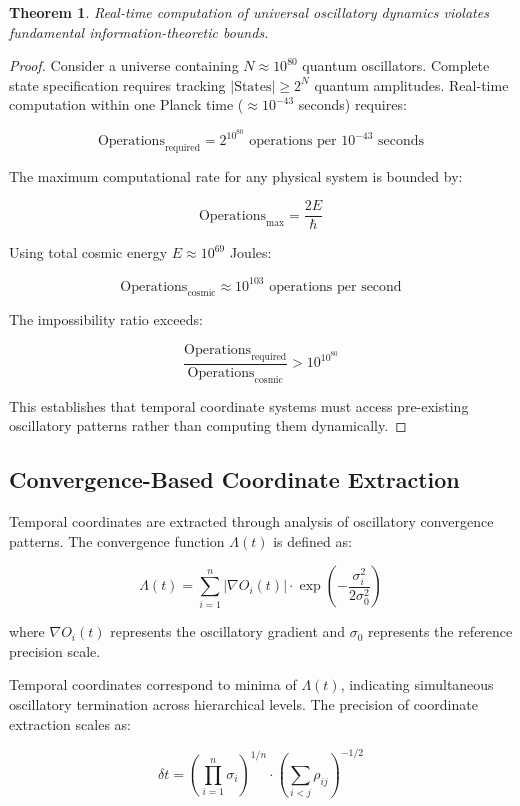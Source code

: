 \documentclass[11pt]{article}
\newtheorem{theorem}{Theorem}[section]
\theoremstyle{remark}
\begin{document}
\begin{theorem}
Real-time computation of universal oscillatory dynamics violates fundamental information-theoretic bounds.
\end{theorem}

\begin{proof}
Consider a universe containing $N \approx 10^{80}$ quantum oscillators. Complete state specification requires tracking $|\text{States}| \geq 2^N$ quantum amplitudes. Real-time computation within one Planck time ($\approx 10^{-43}$ seconds) requires:

$$\text{Operations}_{\text{required}} = 2^{10^{80}} \text{ operations per } 10^{-43} \text{ seconds}$$

The maximum computational rate for any physical system is bounded by:

$$\text{Operations}_{\text{max}} = \frac{2E}{\hbar}$$

Using total cosmic energy $E \approx 10^{69}$ Joules:

$$\text{Operations}_{\text{cosmic}} \approx 10^{103} \text{ operations per second}$$

The impossibility ratio exceeds:

$$\frac{\text{Operations}_{\text{required}}}{\text{Operations}_{\text{cosmic}}} > 10^{10^{80}}$$

This establishes that temporal coordinate systems must access pre-existing oscillatory patterns rather than computing them dynamically.
\end{proof}

\subsection{Convergence-Based Coordinate Extraction}

Temporal coordinates are extracted through analysis of oscillatory convergence patterns. The convergence function $\Lambda(t)$ is defined as:

$$\Lambda(t) = \sum_{i=1}^{n} |\nabla O_i(t)| \cdot \exp\left(-\frac{\sigma_i^2}{2\sigma_0^2}\right)$$

where $\nabla O_i(t)$ represents the oscillatory gradient and $\sigma_0$ represents the reference precision scale.

Temporal coordinates correspond to minima of $\Lambda(t)$, indicating simultaneous oscillatory termination across hierarchical levels. The precision of coordinate extraction scales as:

$$\delta t = \left(\prod_{i=1}^{n} \sigma_i\right)^{1/n} \cdot \left(\sum_{i<j} \rho_{ij}\right)^{-1/2}$$
\end{document}
